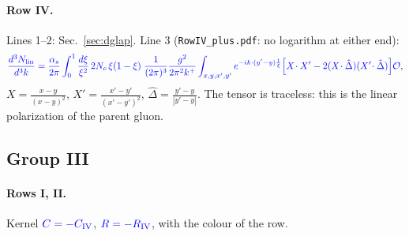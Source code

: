 \documentclass[10pt]{article}
\numberwithin{equation}{section}
\newcommand{\new}[1]{{\color{blue}#1}}
\newcommand{\OO}{\mathcal O}
\newcommand{\Dh}{\hat\Delta}
\newcommand{\pre}{\frac{1}{(2\pi)^3}}
\begin{document}
\paragraph{Row IV.} Lines 1--2: Sec.~\ref{sec:dglap}. Line 3 (\texttt{RowIV\_plus.pdf}: no logarithm at either end):
\begin{equation}
\new{\frac{d^3N_{\rm lin}}{d^3k}=\frac{\alpha_s}{2\pi}\int_0^1\frac{d\xi}{\xi^2}\,2N_c\,\xi(1-\xi)\;\pre\frac{g^2}{2\pi^2k^+}\int_{x,y,x',y'}e^{-ik\cdot(y'-y)\frac1\xi}\Big[X\!\cdot X'-2(X\!\cdot\Dh)(X'\!\cdot\Dh)\Big]\OO},
\label{eq:lin}
\end{equation}
$X=\frac{x-y}{(x-y)^2}$, $X'=\frac{x'-y'}{(x'-y')^2}$, $\Dh=\frac{y'-y}{|y'-y|}$. The tensor is traceless: this is the linear polarization of the parent gluon.

\subsection{Group III}
\paragraph{Rows I, II.} Kernel $\new{C=-C_{\rm IV}}$, $\new{R=-R_{\rm IV}}$, with the colour of the row.
\end{document}
